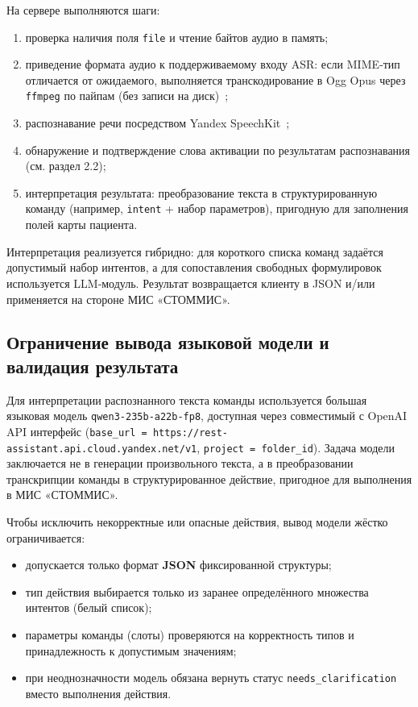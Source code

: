 На сервере выполняются шаги:
\begin{enumerate}
    \item проверка наличия поля \texttt{file} и чтение байтов аудио в память;
    \item приведение формата аудио к поддерживаемому входу ASR: если MIME‑тип отличается от ожидаемого, выполняется транскодирование в Ogg Opus через \texttt{ffmpeg} по пайпам (без записи на диск)~\cite{FFmpeg};
    \item распознавание речи посредством Yandex SpeechKit~\cite{YandexSpeechKit};
    \item обнаружение и подтверждение слова активации по результатам распознавания (см. раздел 2.2);
    \item интерпретация результата: преобразование текста в структурированную команду (например, \texttt{intent} + набор параметров), пригодную для заполнения полей карты пациента.
\end{enumerate}

Интерпретация реализуется гибридно: для короткого списка команд задаётся допустимый набор интентов, а для сопоставления свободных формулировок используется LLM‑модуль.
Результат возвращается клиенту в JSON и/или применяется на стороне МИС «СТОММИС».

\subsection{Ограничение вывода языковой модели и валидация результата}
\label{subsec:llm_constraints}

Для интерпретации распознанного текста команды используется большая языковая модель
\texttt{qwen3-235b-a22b-fp8}, доступная через совместимый с OpenAI API интерфейс
(\texttt{base\_url = https://rest-assistant.api.cloud.yandex.net/v1}, \texttt{project = folder\_id}).
Задача модели заключается не в генерации произвольного текста, а в преобразовании транскрипции команды
в структурированное действие, пригодное для выполнения в МИС «СТОММИС».

Чтобы исключить некорректные или опасные действия, вывод модели жёстко ограничивается:
\begin{itemize}
    \item допускается только формат \textbf{JSON} фиксированной структуры;
    \item тип действия выбирается только из заранее определённого множества интентов (белый список);
    \item параметры команды (слоты) проверяются на корректность типов и принадлежность к допустимым значениям;
    \item при неоднозначности модель обязана вернуть статус \texttt{needs\_clarification} вместо выполнения действия.
\end{itemize}

